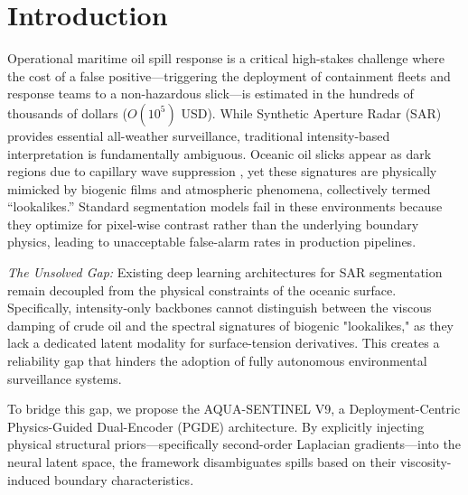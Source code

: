 \section{Introduction}
Operational maritime oil spill response is a critical high-stakes challenge where the cost of a false positive—triggering the deployment of containment fleets and response teams to a non-hazardous slick—is estimated in the hundreds of thousands of dollars ($O(10^5)$ USD). While Synthetic Aperture Radar (SAR) provides essential all-weather surveillance, traditional intensity-based interpretation is fundamentally ambiguous. Oceanic oil slicks appear as dark regions due to capillary wave suppression \cite{solberg2007oil}, yet these signatures are physically mimicked by biogenic films and atmospheric phenomena, collectively termed ``lookalikes.'' Standard segmentation models fail in these environments because they optimize for pixel-wise contrast rather than the underlying boundary physics, leading to unacceptable false-alarm rates in production pipelines.

\textit{The Unsolved Gap:} Existing deep learning architectures for SAR segmentation remain decoupled from the physical constraints of the oceanic surface. Specifically, intensity-only backbones cannot distinguish between the viscous damping of crude oil and the spectral signatures of biogenic "lookalikes," as they lack a dedicated latent modality for surface-tension derivatives. This creates a reliability gap that hinders the adoption of fully autonomous environmental surveillance systems.

To bridge this gap, we propose the AQUA-SENTINEL V9, a Deployment-Centric Physics-Guided Dual-Encoder (PGDE) architecture. By explicitly injecting physical structural priors—specifically second-order Laplacian gradients—into the neural latent space, the framework disambiguates spills based on their viscosity-induced boundary characteristics. 

